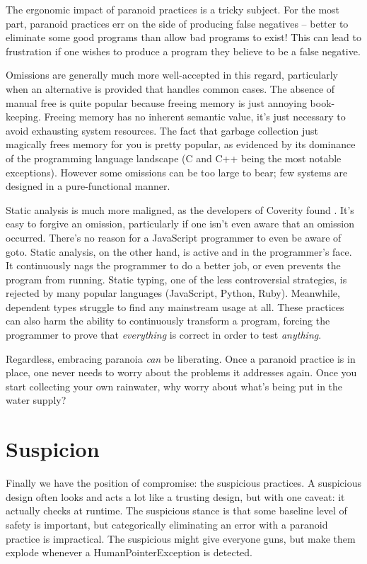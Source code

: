 The ergonomic impact of paranoid practices is a tricky subject. For the most
part, paranoid practices err on the side of producing false negatives -- better to
eliminate some good programs than allow bad programs to exist! This can lead to
frustration if one wishes to produce a program they believe to be a false
negative.

Omissions are generally much more well-accepted in this regard, particularly
when an alternative is provided that handles common cases. The
absence of manual free is quite popular because freeing memory is just annoying
book-keeping. Freeing memory has no inherent semantic value, it's just necessary
to avoid exhausting system resources. The fact that garbage collection just
magically frees memory for you is pretty popular, as evidenced by its dominance
of the programming language landscape (C and C++ being the most notable exceptions).
However some omissions can be too large to bear; few systems are designed in
a pure-functional manner.

Static analysis is much more maligned, as the developers of Coverity found
\cite{bessey2010few}. It's easy to forgive an omission, particularly if one isn't
even aware that an omission occurred. There's no reason for a JavaScript programmer
to even be aware of goto.
Static analysis, on the other hand, is active and in the programmer's face.
It continuously nags the programmer to do a better job, or even prevents the
program from running. Static typing, one of the less controversial
strategies, is rejected by many popular languages (JavaScript, Python, Ruby).
Meanwhile, dependent types struggle to find any mainstream usage at all. These practices
can also harm the ability to continuously transform a program, forcing the
programmer to prove that \emph{everything} is correct in order to test \emph{anything}.

Regardless, embracing paranoia \emph{can} be liberating. Once a paranoid
practice is in place, one never needs to worry about the problems it addresses
again. Once you start collecting your own rainwater, why worry about what's being put
in the water supply?




\section{Suspicion}

Finally we have the position of compromise: the suspicious practices. A suspicious
design often looks and acts a lot like a trusting design, but with one caveat: it
actually checks at runtime. The suspicious stance is that some baseline level of
safety is important, but categorically eliminating an error with a paranoid practice
is impractical. The suspicious might give everyone guns, but make them explode whenever
a HumanPointerException is detected.

